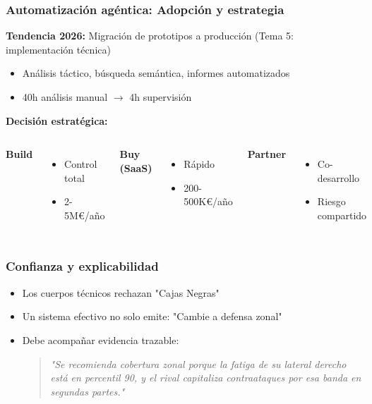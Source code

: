 \documentclass[aspectratio=169]{beamer}
\begin{document}
\begin{frame}\frametitle{Automatización agéntica: Adopción y estrategia}
\textbf{Tendencia 2026:} Migración de prototipos a producción (Tema 5: implementación técnica)
\begin{itemize}
    \item Análisis táctico, búsqueda semántica, informes automatizados
    \item 40h análisis manual $\rightarrow$ 4h supervisión
\end{itemize}

\vspace{0.3em}
\textbf{Decisión estratégica:}
\begin{columns}[T]
\textbf{\small Build}
\begin{itemize}
    \small
    \item Control total
    \item 2-5M\euro/año
\end{itemize}

\textbf{\small Buy (SaaS)}
\begin{itemize}
    \small
    \item Rápido
    \item 200-500K\euro/año
\end{itemize}

\textbf{\small Partner}
\begin{itemize}
    \small
    \item Co-desarrollo
    \item Riesgo compartido
\end{itemize}
\end{columns}
\end{frame}

\begin{frame}\frametitle{Confianza y explicabilidad}
\begin{itemize}
    \item Los cuerpos técnicos rechazan "Cajas Negras"
    \item Un sistema efectivo no solo emite: "Cambie a defensa zonal"
    \item Debe acompañar evidencia trazable:
    \begin{quote}
    \textit{"Se recomienda cobertura zonal porque la fatiga de su lateral derecho está en percentil 90, y el rival capitaliza contraataques por esa banda en segundas partes."}
    \end{quote}
\end{itemize}
\end{frame}
\end{document}
